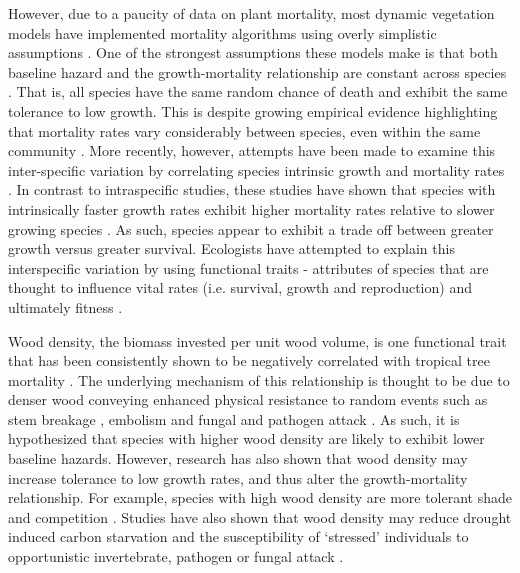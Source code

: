 \documentclass[a4paper,11pt]{article}\usepackage[]{graphicx}\usepackage[]{color}
\begin{document}
However, due to a paucity of data on plant mortality, most dynamic vegetation models have implemented mortality algorithms using overly simplistic assumptions \citep{Hawkes:2000ib, Wyckoff:2000un, McDowell:2011dr}. One of the strongest assumptions these models make is that both baseline hazard and the growth-mortality relationship are constant across species \citep{Pacala:1996vm, Hawkes:2000ib, Wyckoff:2000un}. That is, all species have the same random chance of death and exhibit the same tolerance to low growth. This is despite growing empirical evidence highlighting that mortality rates vary considerably between species, even within the same community \citep{Kobe:1997vy, Wyckoff:2002ul, Kunstler:2005bn, Vieilledent:2010fv}. More recently, however, attempts have been made to examine this inter-specific variation by correlating species intrinsic growth and mortality rates \citep[e.g.][]{Poorter:2008iu, Wright:2010fl}. In contrast to intraspecific studies, these studies have shown that species with intrinsically faster growth rates exhibit higher mortality rates relative to slower growing species \citep{Loehle:1996vw, Poorter:2008iu, Wright:2010fl}. As such, species appear to exhibit a trade off between greater growth versus greater survival. Ecologists have attempted to explain this interspecific variation by using functional traits - attributes of species that are thought to influence vital rates (i.e. survival, growth and reproduction) and ultimately fitness \citep{Westoby:2002tb, Ackerly:2003eb, Falster:2015un}. 

Wood density, the biomass invested per unit wood volume, is one functional trait that has been consistently shown to be negatively correlated with tropical tree mortality \citep{Chave:2009iy, Poorter:2008iu, Kraft:2010kq, Wright:2010fl}. The underlying mechanism of this relationship is thought to be due to denser wood conveying enhanced physical resistance to random events such as stem breakage \citep{Putz:1983wu, vanGelder:2006exa, Chave:2009iy}, embolism \citep{Hacke:2001kj, Jacobsen:2005fx} and fungal and pathogen attack \citep{Augspurger:1984wx}. As such, it is hypothesized that species with higher wood density are likely to exhibit lower baseline hazards. However, research has also shown that wood density may increase tolerance to low growth rates, and thus alter the growth-mortality relationship. For example, species with high wood density are more tolerant shade \citep{vanGelder:2006exa} and competition \citep{Kunstler:2016km}. Studies have also shown that wood density may reduce drought induced carbon starvation \citep{McDowell:2011dr} and the susceptibility of ‘stressed’ individuals to opportunistic invertebrate, pathogen or fungal attack \citep{Augspurger:1984wx, McDowell:2011dr}.
\end{document}
